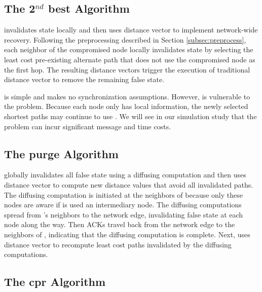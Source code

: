 \subsection{The 2$^{nd}$ best Algorithm}
\label{subsec:second}
\second invalidates state locally and then uses distance vector to implement network-wide recovery.  Following the preprocessing described in Section \ref{subsec:preprocess}, 
each neighbor of the compromised node locally invalidates state by selecting the least cost pre-existing alternate path that does not use the compromised node as the first hop.
The resulting distance vectors trigger the execution of traditional distance vector to remove the remaining false state.

\second is simple and makes no synchronization assumptions. 
However, \second is vulnerable to the \infinity problem. Because each node only has local information, the newly selected shortest paths may continue to use \bads.
We will see in our simulation study that the \infinity problem can incur significant message and time costs.



\subsection{The purge Algorithm}
\label{subsec:purge}


\purge globally invalidates all false state using a diffusing computation and then uses distance vector to compute new distance values that avoid all invalidated paths.
The diffusing computation is initiated at the neighbors of \bad because only these nodes are 
aware if \bad is used an intermediary node. The diffusing computations spread from \bads's neighbors to the network edge, invalidating false state at each node along the way. 
Then ACKs travel back from the network edge to the neighbors of \bads, indicating that the diffusing computation is complete. 
Next, \purge uses distance vector to recompute least cost paths invalidated by the diffusing computations.



\subsection{The cpr Algorithm}
\label{subsec:cpr}

